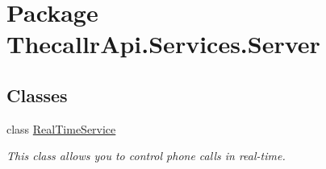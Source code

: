 \hypertarget{namespace_thecallr_api_1_1_services_1_1_server}{\section{Package Thecallr\+Api.\+Services.\+Server}
\label{namespace_thecallr_api_1_1_services_1_1_server}
}
\subsection*{Classes}
\begin{DoxyCompactItemize}
\item 
class \hyperlink{class_thecallr_api_1_1_services_1_1_server_1_1_real_time_service}{Real\+Time\+Service}
\begin{DoxyCompactList}\small\item\em This class allows you to control phone calls in real-\/time. \end{DoxyCompactList}\end{DoxyCompactItemize}
